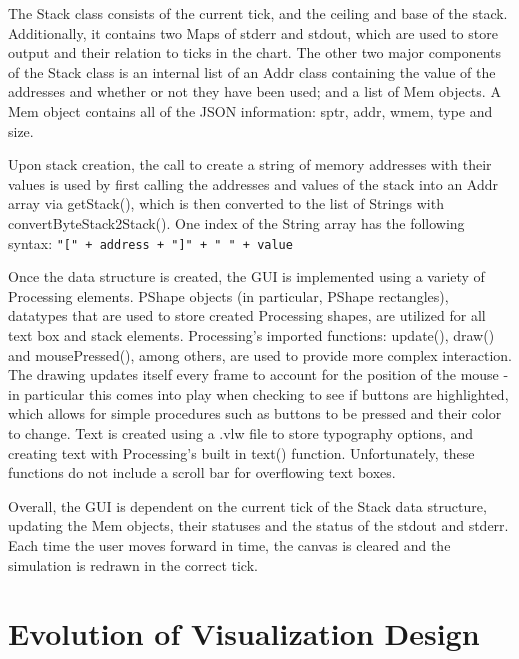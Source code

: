 \documentclass[12pt]{article}
\newcommand{\code}[1]{\texttt{#1}}
\begin{document}
The Stack class consists of the current tick, and the ceiling and base of the stack. Additionally,
it contains two Maps of stderr and stdout, which are used to store output and their relation to
ticks in the chart. The other two major components of the Stack class is an internal list of an
Addr class containing the value of the addresses and whether or not they have been used; and a
list of Mem objects.  A Mem object contains all of the JSON information: sptr, addr, wmem, type
and size.  

Upon stack creation, the call to create a string of memory addresses with their values is used by
first calling the addresses and values of the stack into an Addr array via getStack(), which is
then converted to the list of Strings with convertByteStack2Stack(). One index of the String array
has the following syntax: \code{"[" + address + "]" + " " + value}

Once the data structure is created, the GUI is implemented using a variety of Processing elements.
PShape objects (in particular, PShape rectangles), datatypes that are used to store created Processing
shapes, are utilized for all text box and stack elements. Processing’s imported functions: update(),
draw() and mousePressed(), among others, are used to provide more complex interaction.  The drawing
updates itself every frame to account for the position of the mouse - in particular this comes into
play when checking to see if buttons are highlighted, which allows for simple procedures such as buttons
to be pressed and their color to change.  Text is created using a .vlw file to store typography options,
and creating text with Processing’s built in text() function. Unfortunately, these functions do not
include a scroll bar for overflowing text boxes.  

Overall, the GUI is dependent on the current tick of the Stack data structure, updating the Mem objects,
their statuses and the status of the stdout and stderr. Each time the user moves forward in time,
the canvas is cleared and the simulation is redrawn in the correct tick. 


\section{Evolution of Visualization Design}
\end{document}
